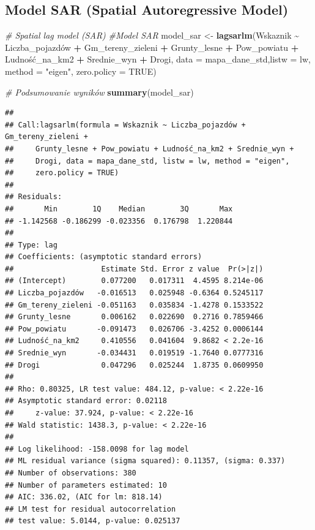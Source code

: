 \documentclass[
  11pt,
]{article}
\newenvironment{Shaded}{\begin{snugshade}}{\end{snugshade}}
\newcommand{\AttributeTok}[1]{\textcolor[rgb]{0.13,0.29,0.53}{#1}}
\newcommand{\CommentTok}[1]{\textcolor[rgb]{0.56,0.35,0.01}{\textit{#1}}}
\newcommand{\ConstantTok}[1]{\textcolor[rgb]{0.56,0.35,0.01}{#1}}
\newcommand{\FunctionTok}[1]{\textcolor[rgb]{0.13,0.29,0.53}{\textbf{#1}}}
\newcommand{\NormalTok}[1]{#1}
\newcommand{\OtherTok}[1]{\textcolor[rgb]{0.56,0.35,0.01}{#1}}
\newcommand{\SpecialCharTok}[1]{\textcolor[rgb]{0.81,0.36,0.00}{\textbf{#1}}}
\newcommand{\StringTok}[1]{\textcolor[rgb]{0.31,0.60,0.02}{#1}}
\begin{document}
\subsection{Model SAR (Spatial Autoregressive
Model)}\label{model-sar-spatial-autoregressive-model}

\begin{Shaded}
\begin{Highlighting}[]
\CommentTok{\# Spatial lag model (SAR)}
\CommentTok{\#Model SAR}
\NormalTok{model\_sar }\OtherTok{\textless{}{-}} \FunctionTok{lagsarlm}\NormalTok{(Wskaznik }\SpecialCharTok{\textasciitilde{}}\NormalTok{ Liczba\_pojazdów }\SpecialCharTok{+}
\NormalTok{                        Gm\_tereny\_zieleni }\SpecialCharTok{+}
\NormalTok{                        Grunty\_lesne }\SpecialCharTok{+}
\NormalTok{                        Pow\_powiatu }\SpecialCharTok{+}
\NormalTok{                        Ludność\_na\_km2 }\SpecialCharTok{+}
\NormalTok{                        Srednie\_wyn }\SpecialCharTok{+}
\NormalTok{                        Drogi,}
                      \AttributeTok{data =}\NormalTok{ mapa\_dane\_std,}\AttributeTok{listw =}\NormalTok{ lw, }\AttributeTok{method =} \StringTok{"eigen"}\NormalTok{, }\AttributeTok{zero.policy =} \ConstantTok{TRUE}\NormalTok{)}

\CommentTok{\# Podsumowanie wyników}
\FunctionTok{summary}\NormalTok{(model\_sar)}
\end{Highlighting}
\end{Shaded}

\begin{verbatim}
## 
## Call:lagsarlm(formula = Wskaznik ~ Liczba_pojazdów + Gm_tereny_zieleni + 
##     Grunty_lesne + Pow_powiatu + Ludność_na_km2 + Srednie_wyn + 
##     Drogi, data = mapa_dane_std, listw = lw, method = "eigen", 
##     zero.policy = TRUE)
## 
## Residuals:
##       Min        1Q    Median        3Q       Max 
## -1.142568 -0.186299 -0.023356  0.176798  1.220844 
## 
## Type: lag 
## Coefficients: (asymptotic standard errors) 
##                    Estimate Std. Error z value  Pr(>|z|)
## (Intercept)        0.077200   0.017311  4.4595 8.214e-06
## Liczba_pojazdów   -0.016513   0.025948 -0.6364 0.5245117
## Gm_tereny_zieleni -0.051163   0.035834 -1.4278 0.1533522
## Grunty_lesne       0.006162   0.022690  0.2716 0.7859466
## Pow_powiatu       -0.091473   0.026706 -3.4252 0.0006144
## Ludność_na_km2     0.410556   0.041604  9.8682 < 2.2e-16
## Srednie_wyn       -0.034431   0.019519 -1.7640 0.0777316
## Drogi              0.047296   0.025244  1.8735 0.0609950
## 
## Rho: 0.80325, LR test value: 484.12, p-value: < 2.22e-16
## Asymptotic standard error: 0.02118
##     z-value: 37.924, p-value: < 2.22e-16
## Wald statistic: 1438.3, p-value: < 2.22e-16
## 
## Log likelihood: -158.0098 for lag model
## ML residual variance (sigma squared): 0.11357, (sigma: 0.337)
## Number of observations: 380 
## Number of parameters estimated: 10 
## AIC: 336.02, (AIC for lm: 818.14)
## LM test for residual autocorrelation
## test value: 5.0144, p-value: 0.025137
\end{verbatim}
\end{document}
